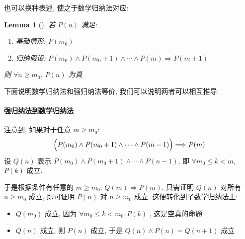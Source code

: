 \documentclass[UTF8]{ctexart}
\newtheorem{lemma}{Lemma}
\begin{document}
也可以换种表述, 使之于数学归纳法对应:
\begin{lemma}[]
    若 $ P(n) $ 满足:
    \begin{enumerate}
        \item 基础情形: $ P(m_0) $
        \item 归纳假设: $ P(m_0) \land P(m_0 + 1) \land \cdots \land P(m) \Longrightarrow P(m + 1) $
    \end{enumerate}
    则 $ \forall n \geqslant m_0 $, $ P(n) $ 为真
\end{lemma}

下面说明数学归纳法和强归纳法等价, 我们可以说明两者可以相互推导.
\paragraph{强归纳法到数学归纳法}
注意到, 如果对于任意 $ m \geqslant m_0 $: \[ \Bigl( P(m_0) \land P(m_0 + 1) \land \cdots \land P(m - 1) \Bigr) \Longrightarrow P(m) \] 设 $ Q(n) $ 表示 $ P(m_0) \land P(m_0 + 1) \land \cdots \land P(n - 1) $, 即 $ \forall m_0 \leqslant k < m $, $ P(k) $ 成立. 

于是根据条件有任意的 $ m \geqslant m_0 $: $ Q(m) \Longrightarrow P(m) $. 只需证明 $ Q(n) $ 对所有 $ n \geqslant m_0 $ 成立, 即可证明 $ P(n) $ 对 $ n \geqslant m_0 $ 成立. 这便转化到了数学归纳法上:
\begin{itemize}
    \item $ Q(m_0) $ 成立, 因为 $ \forall m_0 \leqslant k < m_0, P(k) $ , 这是空真的命题
    \item $ Q(n) $ 成立, 则 $ P(n) $ 成立, 于是 $ Q(n) \land P(n) = Q(n + 1) $ 成立
\end{itemize}
\end{document}
